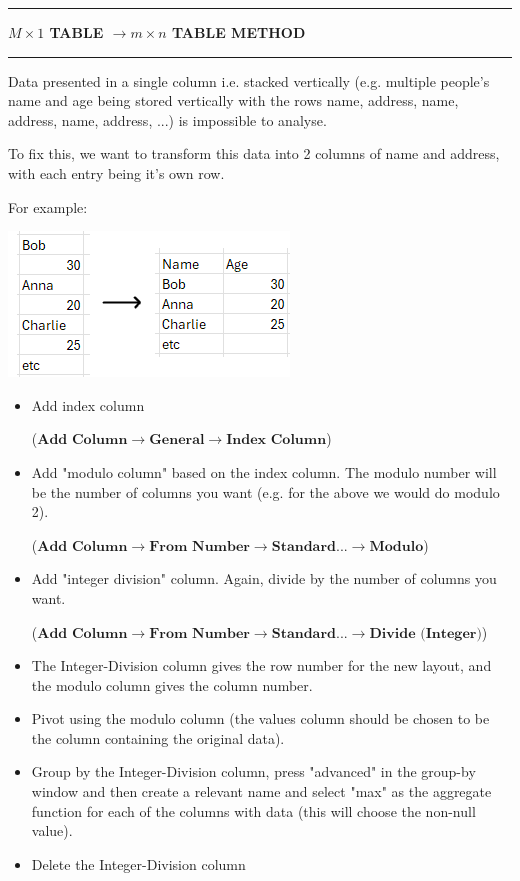 \documentclass[8pt]{extarticle}
\newcommand{\heading}[1]{%
    \noindent
    \rule{\linewidth}{0.4pt}
    \begin{center}
        \vspace{-1ex}
        \textbf{#1}        
        \vspace{-2.5ex}
    \end{center}
    \rule{\linewidth}{0.4pt}
}
\begin{document}
\begin{multicols}{3}
\columnbreak
\heading{$M \times 1$ TABLE $\rightarrow m \times n$ TABLE METHOD}

Data presented in a single column i.e. stacked vertically (e.g. multiple people's name and age being stored vertically with the rows name, address, name, address, name, address, ...) is impossible to analyse. 

To fix this, we want to transform this data into 2 columns of name and address, with each entry being it's own row.

For example:
\begin{center}
    \includegraphics[width=0.65\columnwidth]{images/Mx1_to_mxn.png}
\end{center}

\begin{itemize}
    \item Add index column 
    
    ($\textbf{Add Column} \rightarrow \textbf{General} \rightarrow \textbf{Index Column}$)
    \item Add "modulo column" based on the index column. The modulo number will be the number of columns you want (e.g. for the above we would do modulo 2).
    
    ($\textbf{Add Column} \rightarrow \textbf{From Number} \rightarrow \textbf{Standard...} \rightarrow \textbf{Modulo}$)
    \item Add "integer division" column. Again, divide by the number of columns you want.
    
    ($\textbf{Add Column} \rightarrow \textbf{From Number} \rightarrow \textbf{Standard...} \rightarrow \textbf{Divide (Integer)}$)
    \item The Integer-Division column gives the row number for the new layout, and the modulo column gives the column number.
    \item Pivot using the modulo column (the values column should be chosen to be the column containing the original data).
    \item Group by the Integer-Division column, press "advanced" in the group-by window and then create a relevant name and select "max" as the aggregate function for each of the columns with data (this will choose the non-null value).
    \item Delete the Integer-Division column
\end{itemize}


\end{multicols}
\end{document}
